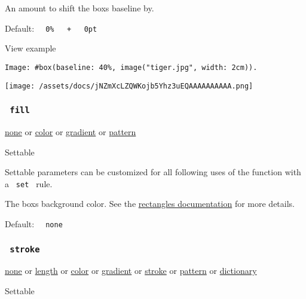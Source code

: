 An amount to shift the box\textquotesingle s baseline by.

Default:
\texttt{\ }{\texttt{\ 0\%\ }}\texttt{\ }{\texttt{\ +\ }}\texttt{\ }{\texttt{\ 0pt\ }}\texttt{\ }


View example

\begin{verbatim}
Image: #box(baseline: 40%, image("tiger.jpg", width: 2cm)).
\end{verbatim}

\texttt{[image: /assets/docs/jNZmXcLZQWKojb5Yhz3uEQAAAAAAAAAA.png]}

\subsubsection{\texorpdfstring{\texttt{\ fill\ }}{ fill }}\label{parameters-fill}

\href{/docs/reference/foundations/none/}{none} {or}
\href{/docs/reference/visualize/color/}{color} {or}
\href{/docs/reference/visualize/gradient/}{gradient} {or}
\href{/docs/reference/visualize/pattern/}{pattern}

{{ Settable }}

\label{parameters-fill-settable-tooltip}
Settable parameters can be customized for all following uses of the
function with a \texttt{\ set\ } rule.

The box\textquotesingle s background color. See the
\href{/docs/reference/visualize/rect/\#parameters-fill}{rectangle\textquotesingle s
documentation} for more details.

Default: \texttt{\ }{\texttt{\ none\ }}\texttt{\ }

\subsubsection{\texorpdfstring{\texttt{\ stroke\ }}{ stroke }}\label{parameters-stroke}

\href{/docs/reference/foundations/none/}{none} {or}
\href{/docs/reference/layout/length/}{length} {or}
\href{/docs/reference/visualize/color/}{color} {or}
\href{/docs/reference/visualize/gradient/}{gradient} {or}
\href{/docs/reference/visualize/stroke/}{stroke} {or}
\href{/docs/reference/visualize/pattern/}{pattern} {or}
\href{/docs/reference/foundations/dictionary/}{dictionary}

{{ Settable }}


